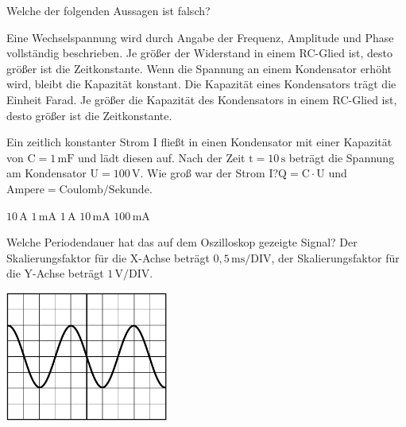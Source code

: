 \documentclass[11pt]{exam}
\begin{document}
\setlength{\voffset}{-0.5in}
\setlength{\headsep}{5pt}

\hspace{2mm}
 \hspace{5mm}
\vspace{4mm}

\begin{questions}

\question Welche der folgenden Aussagen ist falsch?

\begin{choices}
	\choice Eine Wechselspannung wird durch Angabe der Frequenz, Amplitude und Phase vollständig beschrieben.
	\choice Je größer der Widerstand in einem RC-Glied ist, desto größer ist die Zeitkonstante.
	\choice Wenn die Spannung an einem Kondensator erhöht wird, bleibt die Kapazität konstant.
	\choice Die Kapazität eines Kondensators trägt die Einheit Farad.
	\choice Je größer die Kapazität des Kondensators in einem RC-Glied ist, desto größer ist die Zeitkonstante.
\end{choices}

\vspace{3mm}\question Ein zeitlich konstanter Strom \(\mathrm{I}\) fließt in einen Kondensator mit einer Kapazität von \(\mathrm{C=1\,mF}\) und lädt diesen auf. Nach der Zeit \(\mathrm{t=10\,s}\) beträgt die Spannung am Kondensator \(\mathrm{U=100\,V}\). Wie groß war der Strom \(\mathrm{I}\)?\(\mathrm{Q=C \cdot U}\) und \(\mathrm{Ampere=Coulomb/Sekunde}\).

\begin{choices}
	\choice \(\mathrm{10\,A}\)
	\choice \(\mathrm{1\,mA}\)
	\choice \(\mathrm{1\,A}\)
	\choice \(\mathrm{10\,mA}\)
	\choice \(\mathrm{100\,mA}\)
\end{choices}

\vspace{3mm}\question Welche Periodendauer hat das auf dem Oszilloskop gezeigte Signal? Der Skalierungsfaktor für die X-Achse beträgt \(\mathrm{0,5\,ms/DIV}\), der Skalierungsfaktor für die Y-Achse beträgt \(\mathrm{1\,V/DIV}\). 

\includegraphics[width=0.4\textwidth]{images/Oszi1.png}


\end{questions}
\end{document}
